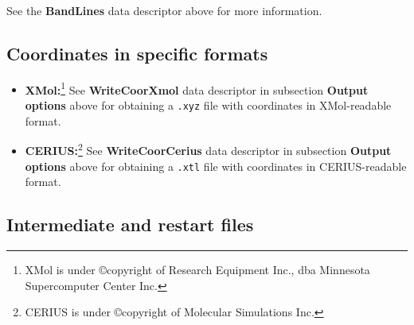 \noindent
See the {\bf BandLines} data descriptor above for more information.


\subsection{Coordinates in specific formats}

\begin{itemize}
\item{\bf XMol:}\footnote[1]{XMol is under \copyright copyright of Research 
Equipment Inc., dba Minnesota Supercomputer Center Inc.}
See {\bf WriteCoorXmol} data descriptor in subsection {\bf Output options}
above for obtaining a {\tt .xyz} file with coordinates in 
XMol-readable format.

\item{\bf CERIUS:}\footnote[2]{CERIUS is under \copyright copyright of 
Molecular Simulations Inc.}
See {\bf WriteCoorCerius} data descriptor in subsection {\bf Output options}
above for obtaining a {\tt .xtl} file with coordinates in 
CERIUS-readable format.

\end{itemize}


\subsection{Intermediate and restart files}

